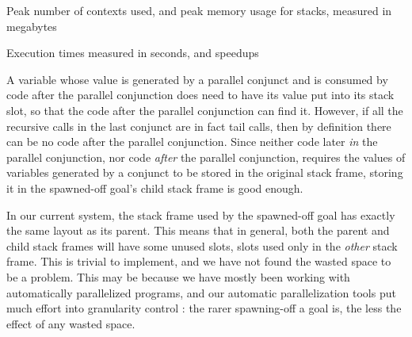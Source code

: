 \begin{table*}[tbh]
\begin{center}

\caption{Peak number of contexts used,
and peak memory usage for stacks, measured in megabytes}
\label{tab:mem}
\end{center}
\end{table*}

\begin{table*}[tb]
\begin{center}

\caption{Execution times measured in seconds, and speedups}
\label{tab:times}
\end{center}
\end{table*}

A variable whose value is generated by a parallel conjunct
and is consumed by code after the parallel conjunction
does need to have its value put into its stack slot,
so that the code after the parallel conjunction can find it.
However, if all the recursive calls in the last conjunct
are in fact tail calls, then by definition
there can be no code after the parallel conjunction.
Since neither code later \emph{in} the parallel conjunction,
nor code \emph{after} the parallel conjunction,
requires the values of variables generated by a conjunct
to be stored in the original stack frame,
storing it in the spawned-off goal's child stack frame is good enough.

In our current system,
the stack frame used by the spawned-off goal
has exactly the same layout as its parent. %
This means that in general,
both the parent and child stack frames will have some unused slots,
slots used only in the \emph{other} stack frame.
This is trivial to implement,
and we have not found the wasted space to be a problem.
This may be because we have mostly been working with
automatically parallelized programs,
and our automatic parallelization tools
put much effort into granularity control \cite{bon-som-tplp-11}:
the rarer spawning-off a goal is,
the less the effect of any wasted space.



